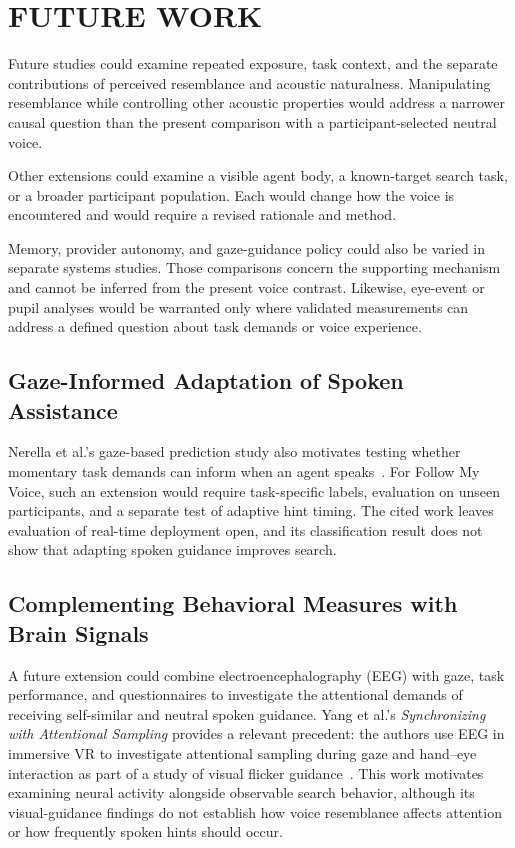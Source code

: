 \chapter{FUTURE WORK}
\label{ch:future-work}
Future studies could examine repeated exposure, task context, and the separate contributions of perceived resemblance and acoustic naturalness. Manipulating resemblance while controlling other acoustic properties would address a narrower causal question than the present comparison with a participant-selected neutral voice.

Other extensions could examine a visible agent body, a known-target search task, or a broader participant population. Each would change how the voice is encountered and would require a revised rationale and method.

Memory, provider autonomy, and gaze-guidance policy could also be varied in separate systems studies. Those comparisons concern the supporting mechanism and cannot be inferred from the present voice contrast. Likewise, eye-event or pupil analyses would be warranted only where validated measurements can address a defined question about task demands or voice experience.

\section{Gaze-Informed Adaptation of Spoken Assistance}
Nerella et al.'s gaze-based prediction study also motivates testing whether momentary task demands can inform when an agent speaks~\cite{nerella2026gaze}. For Follow My Voice, such an extension would require task-specific labels, evaluation on unseen participants, and a separate test of adaptive hint timing. The cited work leaves evaluation of real-time deployment open, and its classification result does not show that adapting spoken guidance improves search.

\section{Complementing Behavioral Measures with Brain Signals}
A future extension could combine electroencephalography (EEG) with gaze, task performance, and questionnaires to investigate the attentional demands of receiving self-similar and neutral spoken guidance. Yang et al.'s \emph{Synchronizing with Attentional Sampling} provides a relevant precedent: the authors use EEG in immersive VR to investigate attentional sampling during gaze and hand--eye interaction as part of a study of visual flicker guidance~\cite{yang2026attentional}. This work motivates examining neural activity alongside observable search behavior, although its visual-guidance findings do not establish how voice resemblance affects attention or how frequently spoken hints should occur.

